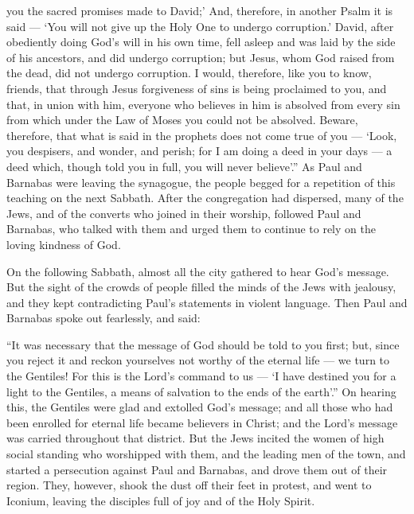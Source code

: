 you the sacred promises made to David;'  And, therefore, in
another Psalm it is said --- `You will not give up the Holy One to
undergo corruption.'  David, after obediently doing God's
will in his own time, fell asleep and was laid by the side of his
ancestors, and did undergo corruption;  but Jesus, whom God
raised from the dead, did not undergo corruption.  I would,
therefore, like you to know, friends, that through Jesus forgiveness of
sins is being proclaimed to you,  and that, in union with
him, everyone who believes in him is absolved from every sin from which
under the Law of Moses you could not be absolved.  Beware,
therefore, that what is said in the prophets does not come true of you
---  `Look, you despisers, and wonder, and perish; for I am
doing a deed in your days --- a deed which, though told you in full, you
will never believe'.''  As Paul and Barnabas were leaving
the synagogue, the people begged for a repetition of this teaching on
the next Sabbath.  After the congregation had dispersed,
many of the Jews, and of the converts who joined in their worship,
followed Paul and Barnabas, who talked with them and urged them to
continue to rely on the loving kindness of God.

 On the following Sabbath, almost all the city gathered to
hear God's message.  But the sight of the crowds of people
filled the minds of the Jews with jealousy, and they kept contradicting
Paul's statements in violent language.  Then Paul and
Barnabas spoke out fearlessly, and said:

``It was necessary that the message of God should be told to you first;
but, since you reject it and reckon yourselves not worthy of the eternal
life --- we turn to the Gentiles!  For this is the Lord's
command to us --- `I have destined you for a light to the Gentiles, a
means of salvation to the ends of the earth'.''  On hearing
this, the Gentiles were glad and extolled God's message; and all those
who had been enrolled for eternal life became believers in Christ;
 and the Lord's message was carried throughout that
district.  But the Jews incited the women of high social
standing who worshipped with them, and the leading men of the town, and
started a persecution against Paul and Barnabas, and drove them out of
their region.  They, however, shook the dust off their feet
in protest,  and went to Iconium, leaving the disciples
full of joy and of the Holy Spirit.

